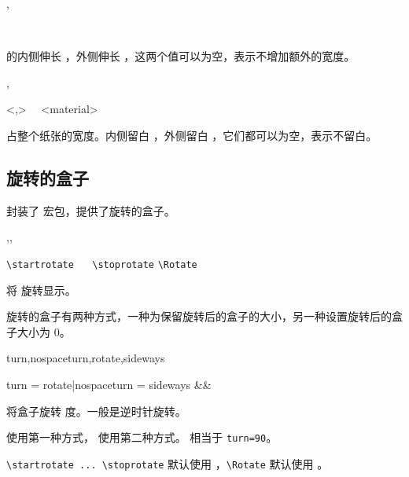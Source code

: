 \documentclass{cusdoc}
\begin{document}
\begin{function}{\startextrawidth,\stopextrawidth}
  \begin{syntax}
    \V\startextrawidth {} 
    \V\startextrawidth {}  
    ~~
    \V\stopextrawidth
  \end{syntax}
 的内侧伸长 ，外侧伸长 ，这两个值可以为空，表示不增加额外的宽度。
\end{function}

\begin{function}{\startfullpagewidth,\stopfullpagewidth}
  \begin{syntax}
    \V\startfullpagewidth
    \V\startfullpagewidth {} \string<,\string>
    ~~<material>
    \V\stopfullpagewidth
  \end{syntax}
 占整个纸张的宽度。内侧留白 ，外侧留白 ，它们都可以为空，表示不留白。
\end{function}

\subsection{旋转的盒子}

\CusTeX 封装了  宏包，提供了旋转的盒子。

\begin{function}{\startrotate,\stoprotate,\Rotate}
  \begin{syntax}
    \verb|\startrotate| 
    ~~
    \verb|\stoprotate|
    \endgraf \medskip 
    \verb|\Rotate|  
  \end{syntax}
将  旋转显示。
\end{function}

旋转的盒子有两种方式，一种为保留旋转后的盒子的大小，另一种设置旋转后的盒子大小为 0。

\begin{keyval}[path=rotate]{turn,nospaceturn,rotate,sideways}
  \begin{syntax}
    turn = 
    rotate|nospaceturn = 
    sideways &&
  \end{syntax}
将盒子旋转  度。一般是逆时针旋转。

 使用第一种方式， 使用第二种方式。 相当于 \verb|turn=90|。

\verb|\startrotate ... \stoprotate| 默认使用 ，\verb|\Rotate| 默认使用
。
\end{keyval}
\end{document}
